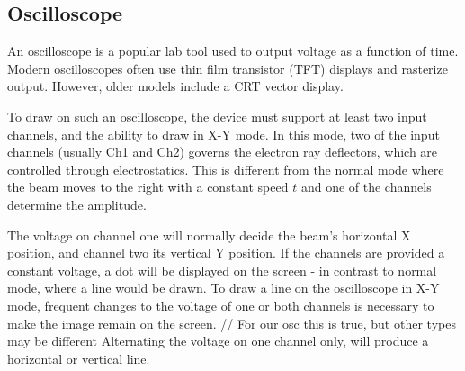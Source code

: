 \subsection{Oscilloscope}
An oscilloscope is a popular lab tool used to output voltage as a function of time.
Modern oscilloscopes often use thin film transistor (TFT) displays and rasterize output. 
However, older models include a CRT vector display.

To draw on such an oscilloscope, the device must support at least two input channels, and the ability to draw in X-Y mode.
In this mode, two of the input channels (usually Ch1 and Ch2) governs the electron ray deflectors, which are controlled through electrostatics. 
This is different from the normal mode where the beam moves to the right with a constant speed \( t \) and one of the channels determine the amplitude.

The voltage on channel one will normally decide the beam's horizontal X position, and channel two its vertical Y position.
If the channels are provided a constant voltage, a dot will be displayed on the screen - in contrast to normal mode, where a line would be drawn.
To draw a line on the oscilloscope in X-Y mode, frequent changes to the voltage of one or both channels is necessary to make the image remain on the screen. // For our osc this is true, but other types may be different
Alternating the voltage on one channel only, will produce a horizontal or vertical line.
